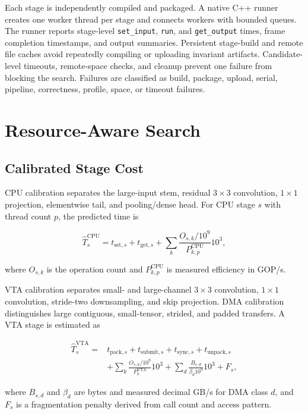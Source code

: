 \documentclass[conference]{IEEEtran}
\begin{document}
Each stage is independently compiled and packaged. A native C++ runner creates one worker thread per stage and connects workers with bounded queues. The runner reports stage-level \texttt{set\_input}, \texttt{run}, and \texttt{get\_output} times, frame completion timestamps, and output summaries. Persistent stage-build and remote file caches avoid repeatedly compiling or uploading invariant artifacts. Candidate-level timeouts, remote-space checks, and cleanup prevent one failure from blocking the search. Failures are classified as build, package, upload, serial, pipeline, correctness, profile, space, or timeout failures.

\section{Resource-Aware Search}

\subsection{Calibrated Stage Cost}

CPU calibration separates the large-input stem, residual $3\times3$ convolution, $1\times1$ projection, elementwise tail, and pooling/dense head. For CPU stage $s$ with thread count $p$, the predicted time is

\begin{equation}
\widehat{T}^{\mathrm{CPU}}_s = t_{\mathrm{set},s}+t_{\mathrm{get},s}+
\sum_k \frac{O_{s,k}/10^9}{P^{\mathrm{CPU}}_{k,p}}10^3,
\label{eq:cpu}
\end{equation}

where $O_{s,k}$ is the operation count and $P^{\mathrm{CPU}}_{k,p}$ is measured efficiency in GOP/s.

VTA calibration separates small- and large-channel $3\times3$ convolution, $1\times1$ convolution, stride-two downsampling, and skip projection. DMA calibration distinguishes large contiguous, small-tensor, strided, and padded transfers. A VTA stage is estimated as

\begin{align}
\widehat{T}^{\mathrm{VTA}}_s ={}&t_{\mathrm{pack},s}+t_{\mathrm{submit},s}+t_{\mathrm{sync},s}+t_{\mathrm{unpack},s}\nonumber\\
&+\sum_k \frac{O_{s,k}/10^9}{P^{\mathrm{VTA}}_k}10^3
+\sum_d \frac{B_{s,d}}{\beta_d 10^9}10^3+F_s,
\label{eq:vta}
\end{align}

where $B_{s,d}$ and $\beta_d$ are bytes and measured decimal GB/s for DMA class $d$, and $F_s$ is a fragmentation penalty derived from call count and access pattern.
\end{document}
